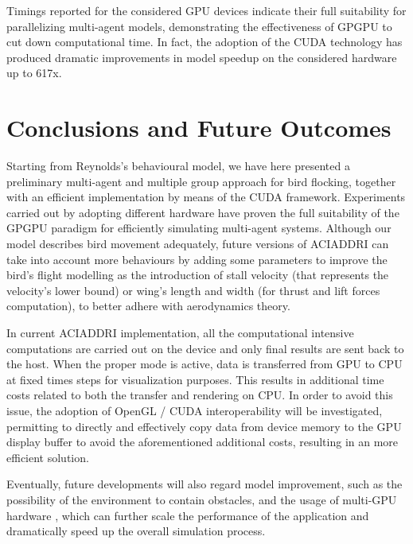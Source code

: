 Timings reported for the considered GPU devices indicate their full suitability for parallelizing multi-agent models, demonstrating the effectiveness of GPGPU to cut down computational time. In fact, the adoption of the CUDA technology has produced dramatic improvements in model speedup on the considered hardware up to 617x. 




\section{Conclusions and Future Outcomes}
\label{sect:Discussion}

Starting from Reynolds's behavioural model, we have here presented a preliminary multi-agent and multiple group approach for bird flocking, together with an efficient implementation by means of the CUDA framework. Experiments carried out by adopting different hardware have proven the full suitability of the GPGPU paradigm for efficiently simulating multi-agent systems.
Although our model describes bird movement adequately, future versions of \textsc{ACIADDRI} can take into account more behaviours by adding some parameters to improve the bird's flight modelling \cite{Dutta:2010,phys.org,Gangshan:2014} as the introduction of stall velocity (that represents the velocity's lower bound) or wing's length and width (for thrust and lift forces computation), to better adhere with aerodynamics theory. 

In current \textsc{ACIADDRI} implementation, all the computational intensive computations are carried out on the device and only final results are sent back to the host.
When the proper mode is active, data is transferred from GPU to CPU at fixed times steps for visualization purposes.
This results in additional time costs related to both the transfer and rendering on CPU.
In order to avoid this issue, the adoption of OpenGL / CUDA interoperability will be investigated, permitting to directly and effectively copy data from device memory to the GPU display buffer to avoid the aforementioned additional costs, resulting in an more efficient solution.

Eventually, future developments will also regard model improvement, such as the possibility of the environment to contain obstacles, and the usage of multi-GPU hardware \cite{Kirk2010,Cheng:2014}, which can further scale the performance of the application and dramatically speed up the overall simulation process.
